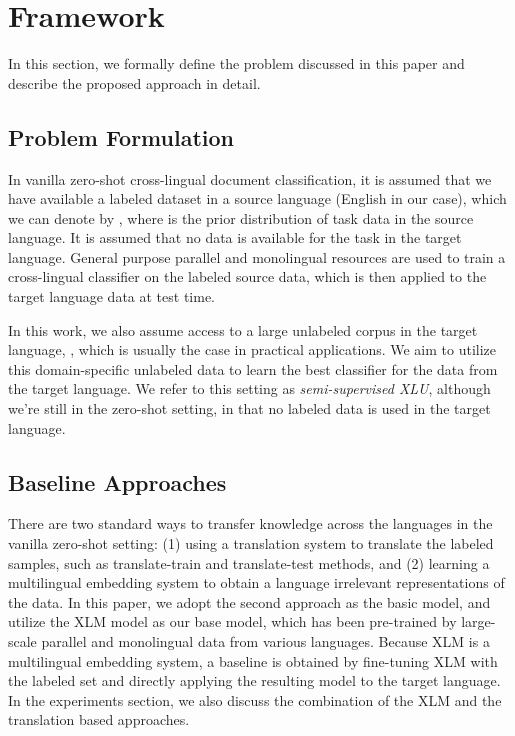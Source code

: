 \documentclass{article} \usepackage{iclr2020_conference,times}
\begin{document}
\section{Framework}
\label{sec:framework}

In this section, we formally define the problem discussed in this paper and describe the proposed approach in detail. 

\subsection{Problem Formulation}
\label{sec:formulation}

In vanilla zero-shot cross-lingual document classification, it is assumed that we have available a labeled dataset in a source language (English in our case), which we can denote by , where  is the prior distribution of task data in the source language.  It is assumed that no data is available for the task in the target language.  General purpose parallel and monolingual resources are used to train a cross-lingual classifier on the labeled source data, which is then applied to the target language data at test time.

In this work, we also assume access to a large unlabeled corpus in the target language, , which is usually the case in practical applications.  We aim to utilize this domain-specific unlabeled data to learn the best classifier for the data from the target language.  We refer to this setting as \textit{semi-supervised XLU}, although we're still in the zero-shot setting, in that no labeled data is used in the target language.

\subsection{Baseline Approaches}
There are two standard ways to transfer knowledge across the languages in the vanilla zero-shot setting: (1) using a translation system to translate the labeled samples, such as translate-train and translate-test methods, and (2) learning a multilingual embedding system to obtain a language irrelevant representations of the data.  
In this paper, we adopt the second approach as the basic model, and utilize the XLM model \citep{lample2019cross} as our base model, which has been pre-trained by large-scale parallel and monolingual data from various languages. 
Because XLM is a multilingual embedding system, a baseline is obtained by fine-tuning XLM with the labeled set  and directly applying the resulting model to the target language. In the experiments section, we also discuss the combination of the XLM and the translation based approaches.
\end{document}
